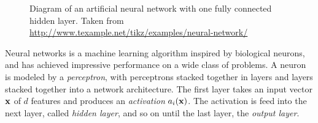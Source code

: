 \begin{figure}[t]
  \label{fig:neuralnet}
  \centering
  \def\layersep{2.5cm}
  \caption{Diagram of an artificial neural network with one fully connected hidden layer. Taken
    from \url{http://www.texample.net/tikz/examples/neural-network/}}
\end{figure}


Neural networks is a machine learning algorithm inspired by biological neurons,
and has achieved impressive performance on a wide class of problems. A neuron is
modeled by a \textit{perceptron}, with perceptrons stacked together in layers
and layers stacked together into a network architecture. The first layer takes
an input vector \(\vb{x}\) of \(d\) features and produces an \textit{activation}
\(a_{i}(\vb{x})\). The activation is feed into the next layer, called
\textit{hidden layer}, and so on until
the last layer, the \textit{output layer}.

